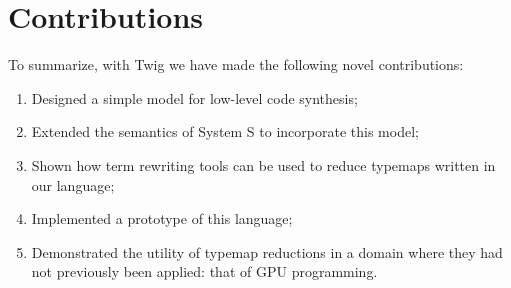 
\section{Contributions}

To summarize, with Twig we have made the following novel
contributions:

\begin{enumerate}

\item Designed a simple model for low-level code synthesis;

\item Extended the semantics of System S to incorporate this
model;

\item Shown how term rewriting tools can be used to reduce
typemaps written in our language;

\item Implemented a prototype of this language;

\item Demonstrated the utility of typemap reductions in a domain
where they had not previously been applied: that of GPU
programming.

\end{enumerate}
